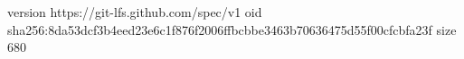 version https://git-lfs.github.com/spec/v1
oid sha256:8da53dcf3b4eed23e6c1f876f2006ffbcbbe3463b70636475d55f00cfcbfa23f
size 680
